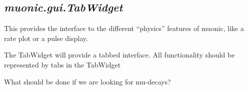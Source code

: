 \documentclass[letterpaper,10pt,english]{sphinxmanual}
\begin{document}
\subsection{\emph{muonic.gui.TabWidget}}
\label{muonic:muonic-gui-tabwidget}
This provides the interface to the different ``physics'' features of muonic, like a rate plot or a pulse display.
\label{muonic:module-muonic.gui.TabWidget}

\begin{fulllineitems}
\label{muonic:muonic.gui.TabWidget.TabWidget}
The TabWidget will provide a tabbed interface.
All functionality should be represented by tabs in the TabWidget

\begin{fulllineitems}
\label{muonic:muonic.gui.TabWidget.TabWidget.activateMuondecayClicked}
What should be done if we are looking for mu-decays?

\end{fulllineitems}


\begin{fulllineitems}
\label{muonic:muonic.gui.TabWidget.TabWidget.activatePulseanalyzerClicked}
\end{fulllineitems}


\begin{fulllineitems}
\label{muonic:muonic.gui.TabWidget.TabWidget.center}
\end{fulllineitems}


\begin{fulllineitems}
\label{muonic:muonic.gui.TabWidget.TabWidget.mufitClicked}
\end{fulllineitems}


\end{fulllineitems}
\end{document}
